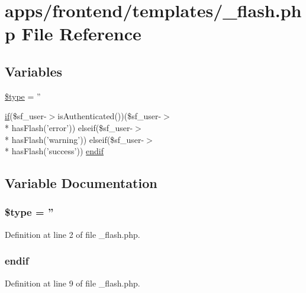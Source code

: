 \hypertarget{__flash_8php}{\section{apps/frontend/templates/\-\_\-flash.php File Reference}
\label{__flash_8php}
}
\subsection*{Variables}
\begin{DoxyCompactItemize}
\item 
\hyperlink{__flash_8php_a9a4a6fba2208984cabb3afacadf33919}{\$type} = ''
\item 
\hyperlink{live_2modules_2tournament_2templates_2__form_team_8php_ae30a307b320d8da5d9a945eaf68f7549}{if}(\$sf\-\_\-user-\/$>$is\-Authenticated())(\$sf\-\_\-user-\/$>$\\*
has\-Flash('error')) elseif(\$sf\-\_\-user-\/$>$\\*
has\-Flash('warning')) elseif(\$sf\-\_\-user-\/$>$\\*
has\-Flash('success')) \hyperlink{__flash_8php_a82cd33ca97ff99f2fcc5e9c81d65251b}{endif}
\end{DoxyCompactItemize}


\subsection{Variable Documentation}
\hypertarget{__flash_8php_a9a4a6fba2208984cabb3afacadf33919}{
\subsubsection[{\$type}]{\setlength{\rightskip}{0pt plus 5cm}\$type = ''}}\label{__flash_8php_a9a4a6fba2208984cabb3afacadf33919}


Definition at line 2 of file \-\_\-flash.\-php.

\hypertarget{__flash_8php_a82cd33ca97ff99f2fcc5e9c81d65251b}{
\subsubsection[{endif}]{\setlength{\rightskip}{0pt plus 5cm}endif}}\label{__flash_8php_a82cd33ca97ff99f2fcc5e9c81d65251b}


Definition at line 9 of file \-\_\-flash.\-php.

